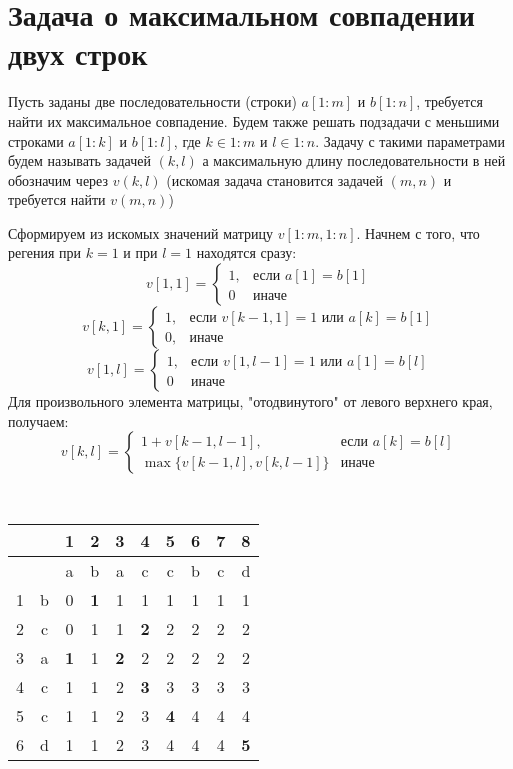 \documentclass[discrete.tex]{subfiles}
\begin{document}
\section{Задача о максимальном совпадении двух строк}
\begin{Task}
  Пусть заданы две последовательности (строки) $a[1:m]$ и $b[1:n]$, требуется найти их максимальное совпадение. Будем также решать подзадачи с меньшими строками $a[1:k]$ и $b[1:l]$, где $k \in 1:m$ и $l \in 1:n$. Задачу с такими параметрами будем называть задачей $(k,l)$ а максимальную длину последовательности в ней обозначим через $v(k,l)$ (искомая задача становится задачей $(m,n)$ и требуется найти $v(m,n)$)

  Сформируем из искомых значений матрицу $v[1:m,1:n]$. Начнем с того, что регения при $k=1$ и при $l=1$ находятся сразу:
  \[v[1,1] = \begin{cases}
    1, & \text{если }a[1]=b[1]\\
    0 & \text{иначе}
  \end{cases}\]
  \[v[k,1] = \begin{cases}
    1, & \text{если }v[k-1,1]=1 \text{ или } a[k]=b[1]\\
    0, & \text{иначе}
  \end{cases}\]
  \[v[1,l] = \begin{cases}
    1, & \text{если }v[1,l-1]=1 \text{ или } a[1]=b[l]\\
    0 & \text{иначе}
  \end{cases}\]
  Для произвольного элемента матрицы, "отодвинутого"{} от левого верхнего края, получаем:
  \[v[k,l] = \begin{cases}
    1 + v[k-1,l-1], & \text{если }a[k]=b[l]\\
    \max\{v[k-1,l],v[k,l-1]\} & \text{иначе}
  \end{cases}\]
\end{Task}

\begin{example} \ \\
  \begin{tabular}{c|c|cccccccc}
      &   & 1 & 2 & 3 & 4 & 5 & 6 & 7 & 8\\
      \hline
      &   & a & b & a & c & c & b & c & d\\
    \hline
    1 & b & 0 & \bfseries 1 & 1 & 1 & 1 & 1 & 1 & 1\\
    2 & c & 0 & 1 & 1 & \bfseries 2 & 2 & 2 & 2 & 2\\
    3 & a & \bfseries 1 & 1 & \bfseries 2 & 2 & 2 & 2 & 2 & 2\\
    4 & c & 1 & 1 & 2 & \bfseries 3 & 3 & 3 & 3 & 3\\
    5 & c & 1 & 1 & 2 & 3 & \bfseries 4 & 4 & 4 & 4\\
    6 & d & 1 & 1 & 2 & 3 & 4 & 4 & 4 & \bfseries 5
  \end{tabular}
\end{example}
\end{document}
